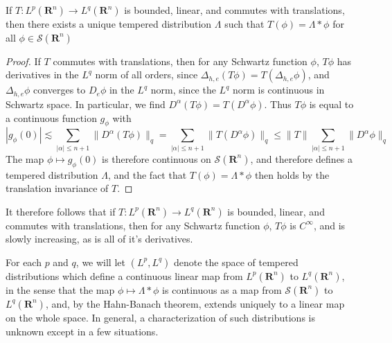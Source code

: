 \begin{theorem}
	If $T: L^p(\mathbf{R}^n) \to L^q(\mathbf{R}^n)$ is bounded, linear, and commutes with translations, then there exists a unique tempered distribution $\Lambda$ such that $T(\phi) = \Lambda * \phi$ for all $\phi \in \mathcal{S}(\mathbf{R}^n)$
\end{theorem}
\begin{proof}
	If $T$ commutes with translations, then for any Schwartz function $\phi$, $T\phi$ has derivatives in the $L^q$ norm of all orders, since $\Delta_{h,e}(T \phi) = T(\Delta_{h,e} \phi)$, and $\Delta_{h,e} \phi$ converges to $D_e \phi$ in the $L^q$ norm, since the $L^q$ norm is continuous in Schwartz space. In particular, we find $D^\alpha (T\phi) = T(D^\alpha \phi)$. Thus $T\phi$ is equal to a continuous function $g_\phi$ with
	\[ |g_\phi(0)| \lesssim \sum_{|\alpha| \leq n+1} \| D^\alpha(T\phi) \|_q = \sum_{|\alpha| \leq n+1} \| T(D^\alpha \phi) \|_q \leq \| T \| \sum_{|\alpha| \leq n+1} \| D^\alpha \phi \|_q \]
	The map $\phi \mapsto g_\phi(0)$ is therefore continuous on $\mathcal{S}(\mathbf{R}^n)$, and therefore defines a tempered distribution $\Lambda$, and the fact that $T(\phi) = \Lambda * \phi$ then holds by the translation invariance of $T$.
\end{proof}

\begin{remark}
	It therefore follows that if $T: L^p(\mathbf{R}^n) \to L^q(\mathbf{R}^n)$ is bounded, linear, and commutes with translations, then for any Schwartz function $\phi$, $T\phi$ is $C^\infty$, and is slowly increasing, as is all of it's derivatives.
\end{remark}

For each $p$ and $q$, we will let $(L^p,L^q)$ denote the space of tempered distributions which define a continuous linear map from $L^p(\mathbf{R}^n)$ to $L^q(\mathbf{R}^n)$, in the sense that the map $\phi \mapsto \Lambda * \phi$ is continuous as a map from $\mathcal{S}(\mathbf{R}^n)$ to $L^q(\mathbf{R}^n)$, and, by the Hahn-Banach theorem, extends uniquely to a linear map on the whole space. In general, a characterization of such distributions is unknown except in a few situations.

